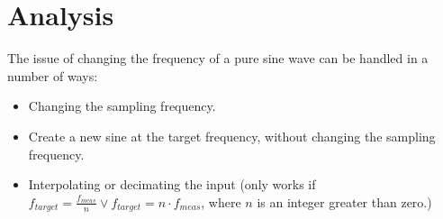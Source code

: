
\section{Analysis}
The issue of changing the frequency of a pure sine wave can be handled in a number of ways:
\begin{itemize}
	\item Changing the sampling frequency.
	\item Create a new sine at the target frequency, without changing the sampling frequency.
	\item Interpolating or decimating the input (only works if $f_{target}=\frac{f_{meas}}{n}\vee f_{target} =n\cdot f_{meas}$, where $n$ is an integer greater than zero.)
\end{itemize}